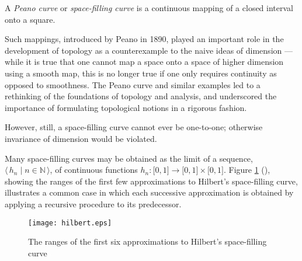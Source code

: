 \documentclass[12pt]{article}
\begin{document}

A \emph{Peano curve} or \emph{space-filling curve} is a continuous mapping of a closed interval onto a square.  

Such mappings, introduced by Peano in 1890, played an
important role in the development of topology as a counterexample 
to the naive ideas of dimension --- while it is
true that one cannot map a space onto a space of higher dimension using a 
smooth map, this is no longer true if one only requires continuity as opposed to
smoothness.  The Peano curve and similar examples led to a rethinking of the foundations
of topology and analysis, and underscored the importance of formulating 
topological notions in a rigorous fashion.

However, still, a space-filling curve cannot ever be one-to-one;
otherwise invariance of dimension would be violated.

Many space-filling curves may be obtained as the limit of a sequence, $\langle \, h_n \mid n \in \mathbb{N} \, \rangle$, of continuous functions $h_n \colon \lbrack 0,1\rbrack \to \lbrack 0,1\rbrack \times \lbrack 0,1\rbrack$. Figure \ref{fig:graph} (), showing the ranges of the first few approximations to Hilbert's space-filling curve, illustrates a common case in which each successive approximation is obtained by applying a recursive procedure to its predecessor.

\begin{figure}[h]
 \centering
 \texttt{[image: hilbert.eps]}
 \caption{The ranges of the first six approximations to Hilbert's space-filling curve}
 \label{fig:graph}
\end{figure}


\end{document}
